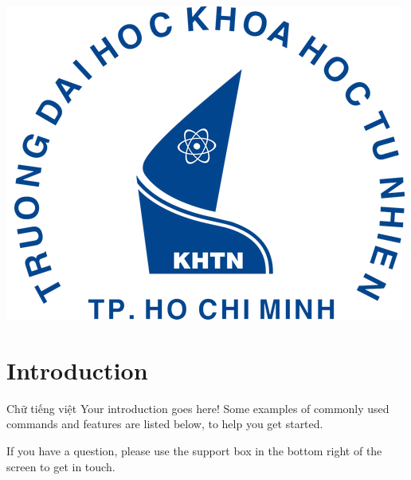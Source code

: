 \begin{titlepage}



\includegraphics{logo/rsz_3logo-khtn.png}\\[1cm] %
 

\vfill %

\end{titlepage}


\section{Introduction}
Chữ tiếng việt
Your introduction goes here! Some examples of commonly used commands and features are listed below, to help you get started.

If you have a question, please use the support box in the bottom right of the screen to get in touch. 

